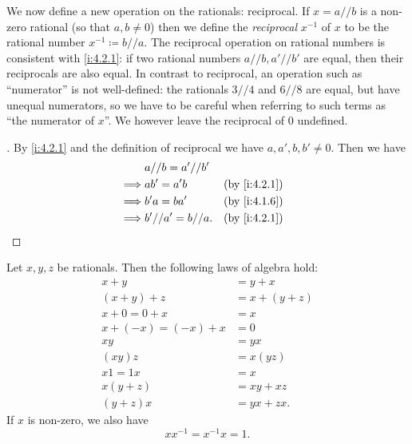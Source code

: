 \begin{ac}\label{i:ac:4.2.3}
  We now define a new operation on the rationals: reciprocal.
  If \(x = a // b\) is a non-zero rational (so that \(a, b \neq 0\)) then we define the \emph{reciprocal} \(x^{-1}\) of \(x\) to be the rational number \(x^{-1} \coloneqq b // a\).
  The reciprocal operation on rational numbers is consistent with \cref{i:4.2.1}:
  if two rational numbers \(a // b, a' // b'\) are equal, then their reciprocals are also equal.
  In contrast to reciprocal, an operation such as ``numerator'' is not well-defined:
  the rationals \(3 // 4\) and \(6 // 8\) are equal, but have unequal numerators, so we have to be careful when referring to such terms as ``the numerator of \(x\)''.
  We however leave the reciprocal of \(0\) undefined.
\end{ac}

\begin{proof}[]
  By \cref{i:4.2.1} and the definition of reciprocal we have \(a, a', b, b' \neq 0\).
  Then we have
  \begin{align*}
             & a // b = a' // b'                    \\
    \implies & ab' = a'b          &  & \by{i:4.2.1} \\
    \implies & b'a = ba'          &  & \by{i:4.1.6} \\
    \implies & b' // a' = b // a. &  & \by{i:4.2.1}
  \end{align*}
\end{proof}

\begin{prop}\label{i:4.2.4}
  Let \(x, y, z\) be rationals.
  Then the following laws of algebra hold:
  \begin{align*}
    x + y               & = y + x       \\
    (x + y) + z         & = x + (y + z) \\
    x + 0 = 0 + x       & = x           \\
    x + (-x) = (-x) + x & = 0           \\
    xy                  & = yx          \\
    (xy)z               & = x(yz)       \\
    x1 = 1x             & = x           \\
    x(y + z)            & = xy + xz     \\
    (y + z)x            & = yx + zx.
  \end{align*}
  If \(x\) is non-zero, we also have
  \[
    xx^{-1} = x^{-1}x = 1.
  \]
\end{prop}


